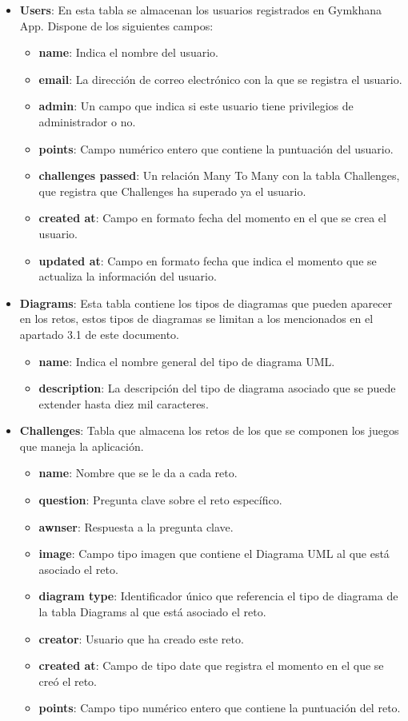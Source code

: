 \documentclass[a4paper, 12pt]{book}
\begin{document}
\begin{itemize}
	\item \textbf {Users}: En esta tabla se almacenan los usuarios registrados en Gymkhana App. Dispone de los siguientes campos: 
	\begin{itemize}
		\item \textbf {name}: Indica el nombre del usuario. 
		\item \textbf {email}: La dirección de correo electrónico con la que se registra el usuario. 
		\item \textbf {admin}: Un campo que indica si este usuario tiene privilegios de administrador o no. 
		\item \textbf {points}: Campo numérico entero que contiene la puntuación del usuario. 
		\item \textbf {challenges passed}: Un relación Many To Many con la tabla Challenges, que registra que Challenges ha superado ya el usuario. 
		\item \textbf {created at}: Campo en formato fecha del momento en el que se crea el usuario. 
		\item \textbf {updated at}: Campo en formato fecha que indica el momento que se actualiza la información del usuario. 
	\end{itemize}

	\item \textbf {Diagrams}: Esta tabla contiene los tipos de diagramas que pueden aparecer en los retos, estos tipos de diagramas se limitan a los mencionados en el apartado 3.1 de este documento.  
	\begin{itemize}
		\item \textbf {name}: Indica el nombre general del tipo de diagrama UML. 
		\item \textbf {description}: La descripción del tipo de diagrama asociado que se puede extender hasta diez mil caracteres. 
	\end{itemize}
	
	\item \textbf {Challenges}: Tabla que almacena los retos de los que se componen los juegos que maneja la aplicación. 
	\begin{itemize}
		\item \textbf {name}: Nombre que se le da a cada reto.
		\item \textbf {question}: Pregunta clave sobre el reto específico. 
		\item \textbf {awnser}: Respuesta a la pregunta clave. 
		\item \textbf {image}: 	Campo tipo imagen que contiene el Diagrama UML al que está asociado el reto. 
		\item \textbf {diagram type}: Identificador único que referencia el tipo de diagrama de la tabla Diagrams al que está asociado el reto. 
		\item \textbf {creator}: Usuario que ha creado este reto. 
		\item \textbf {created at}: Campo de tipo date que registra el momento en el que se creó el reto. 
		\item \textbf {points}: Campo tipo numérico entero que contiene la puntuación del reto. 		
	\end{itemize}
	

\end{itemize}
\end{document}

